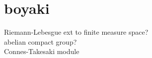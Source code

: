 \section{boyaki}
Riemann-Lebesgue ext to finite measure space?\\
abelian compact group?\\
Connes-Takesaki module\\
